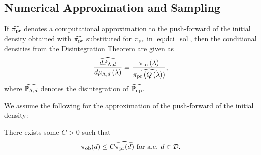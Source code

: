 \subsection{Numerical Approximation and Sampling}\label{sec:approx}
%
%
%
%



If $\widehat{\operatorname*{\pi_{pr}}}$ denotes a computational approximation to the push-forward of the initial density obtained with $\widehat{\operatorname*{\pi_{pr}}}$ substituted for $\operatorname*{\pi_{pr}}$ in \eqref{eq:dci_sol}, then the conditional densities from the Disintegration Theorem are given as
\[
\frac{\widehat{d\mathbb{P}_{{\Lambda}, d}}}{d\mu_{{\Lambda}, d}\left ( \lambda \right )} = \frac{\operatorname*{\pi_{in}}\left ( \lambda \right )}{ \widehat{\operatorname*{\pi_{pr}}\left ( Q\left ( \lambda \right ) \right )} },
\]
where $\widehat{\mathbb{P}_{{\Lambda}, d}}$ denotes the disintegration of $\widehat{\operatorname*{\mathbb{P}_{up}}}$.


We assume the following for the approximation of the push-forward of the initial density:
\begin{assumption}\label{as:predicted-theoreticalx}
There exists some $C>0$ such that
\[
\operatorname*{\pi_{ob}} (d) \leq C \widehat{\operatorname*{\pi_{pr}}(d)} \text{ for a.e. } d\in \mathcal{D}.
\]
\end{assumption}

